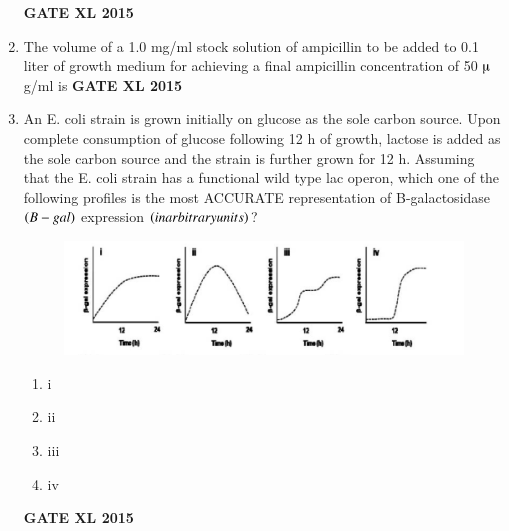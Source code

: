 \documentclass[journal,12pt,onecolumn]{IEEEtran}
\begin{document}
\begin{enumerate}
\hfill{\textbf{GATE XL 2015}}
\item  The volume  of a 1.0 mg/ml stock solution of ampicillin to be added to 0.1 liter of growth medium for achieving a final ampicillin concentration of 50 $\micro$g/ml is
\hfill{\textbf{GATE XL 2015}}
\item An E. coli strain is grown initially on glucose as the sole carbon source. Upon complete consumption of glucose following 12 h of growth, lactose is added as the sole carbon source and the strain is further grown for 12 h. Assuming that the E. coli strain has a functional wild type lac operon, which one of the following profiles is the most ACCURATE representation of B-galactosidase $\left(B-gal\right)$ expression $\left(in arbitrary units\right)$?
	\begin{figure}[h!]
		\centering
	\includegraphics[width=15cm]{85}
		    \caption*{}
		\label{fig:Q85}
	\end{figure}
    \begin{enumerate}
            \item i
	    \item ii
	    \item iii
            \item iv
    \end{enumerate}
\hfill{\textbf{GATE XL 2015}}
	

\end{enumerate}
\end{document}

